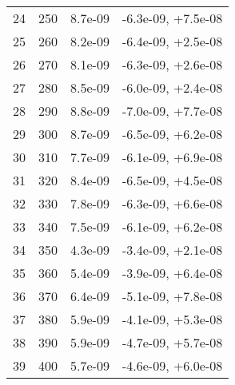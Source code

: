 \begin{table}
\begin{adjustbox}{width=1\textwidth/2}
\begin{tabular}{|c|c|c|c|}
\cline{1-4}
24 & 250 & 8.7e-09 & -6.3e-09, +7.5e-08 \\
\cline{1-4}
25 & 260 & 8.2e-09 & -6.4e-09, +2.5e-08 \\
\cline{1-4}
26 & 270 & 8.1e-09 & -6.3e-09, +2.6e-08 \\
\cline{1-4}
27 & 280 & 8.5e-09 & -6.0e-09, +2.4e-08 \\
\cline{1-4}
28 & 290 & 8.8e-09 & -7.0e-09, +7.7e-08 \\
\cline{1-4}
29 & 300 & 8.7e-09 & -6.5e-09, +6.2e-08 \\
\cline{1-4}
30 & 310 & 7.7e-09 & -6.1e-09, +6.9e-08 \\
\cline{1-4}
31 & 320 & 8.4e-09 & -6.5e-09, +4.5e-08 \\
\cline{1-4}
32 & 330 & 7.8e-09 & -6.3e-09, +6.6e-08 \\
\cline{1-4}
33 & 340 & 7.5e-09 & -6.1e-09, +6.2e-08 \\
\cline{1-4}
34 & 350 & 4.3e-09 & -3.4e-09, +2.1e-08 \\
\cline{1-4}
35 & 360 & 5.4e-09 & -3.9e-09, +6.4e-08 \\
\cline{1-4}
36 & 370 & 6.4e-09 & -5.1e-09, +7.8e-08 \\
\cline{1-4}
37 & 380 & 5.9e-09 & -4.1e-09, +5.3e-08 \\
\cline{1-4}
38 & 390 & 5.9e-09 & -4.7e-09, +5.7e-08 \\
\cline{1-4}
39 & 400 & 5.7e-09 & -4.6e-09, +6.0e-08 \\
\cline{1-4}
\end{tabular}
\end{adjustbox}
\end{table}

